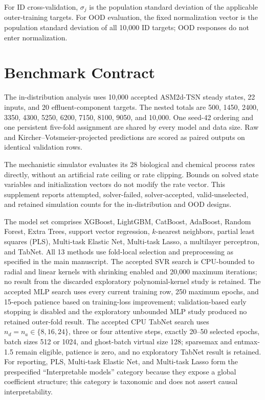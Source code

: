 \documentclass[a4paper,11pt]{article}
\begin{document}
For ID cross-validation, $\sigma_j$ is the population standard deviation of the applicable outer-training targets. For OOD evaluation, the fixed normalization vector is the population standard deviation of all 10,000 ID targets; OOD responses do not enter normalization.

\section{Benchmark Contract}

The in-distribution analysis uses 10,000 accepted ASM2d-TSN steady states, 22 inputs, and 20 effluent-component targets. The nested totals are 500, 1450, 2400, 3350, 4300, 5250, 6200, 7150, 8100, 9050, and 10,000. One seed-42 ordering and one persistent five-fold assignment are shared by every model and data size. Raw and Kircher--Votsmeier-projected predictions are scored as paired outputs on identical validation rows.

The mechanistic simulator evaluates its 28 biological and chemical process rates directly, without an artificial rate ceiling or rate clipping. Bounds on solved state variables and initialization vectors do not modify the rate vector. This supplement reports attempted, solver-failed, solver-accepted, valid-unselected, and retained simulation counts for the in-distribution and OOD designs.

The model set comprises XGBoost, LightGBM, CatBoost, AdaBoost, Random Forest, Extra Trees, support vector regression, $k$-nearest neighbors, partial least squares (PLS), Multi-task Elastic Net, Multi-task Lasso, a multilayer perceptron, and TabNet. All 13 methods use fold-local selection and preprocessing as specified in the main manuscript. The accepted SVR search is CPU-bounded to radial and linear kernels with shrinking enabled and 20,000 maximum iterations; no result from the discarded exploratory polynomial-kernel study is retained. The accepted MLP search uses every current training row, 250 maximum epochs, and 15-epoch patience based on training-loss improvement; validation-based early stopping is disabled and the exploratory unbounded MLP study produced no retained outer-fold result. The accepted CPU TabNet search uses $n_d=n_a\in\{8,16,24\}$, three or four attentive steps, exactly 20--50 selected epochs, batch sizes 512 or 1024, and ghost-batch virtual size 128; sparsemax and entmax-1.5 remain eligible, patience is zero, and no exploratory TabNet result is retained. For reporting, PLS, Multi-task Elastic Net, and Multi-task Lasso form the prespecified ``Interpretable models'' category because they expose a global coefficient structure; this category is taxonomic and does not assert causal interpretability.
\end{document}
